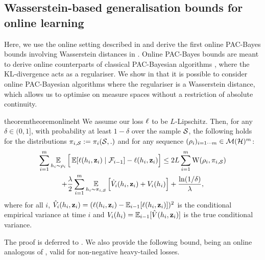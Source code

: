 \documentclass{article}
\begin{document}
\subsection{Wasserstein-based generalisation bounds for online learning}
\label{sec:wasserstein-online}
Here, we use the online setting described in  and derive the first online PAC-Bayes bounds involving Wasserstein distances in . 
Online PAC-Bayes bounds are meant to derive online counterparts of classical PAC-Bayesian algorithms \cite{haddouche2022online}, where the KL-divergence acts as a regulariser.
We show in   that it is possible to consider online PAC-Bayesian algorithms where the regulariser is a Wasserstein distance, which allows us to optimise on measure spaces without a restriction of absolute continuity.

\begin{restatable}{theorem}{theoremonlineht}\label{theorem:online-ht}
 We assume our loss $\loss$ to be $L$-Lipschitz.
Then, for any $\delta\in(0,1]$, with probability at least $1-\delta$ over the sample $\S$, the following holds for the distributions $\P_{i,\S}\defeq \P_i(\S,.)$ and for any sequence $(\Q_i)_{i=1\cdots m}\in\Mcal(\H)^m$:
\begin{multline*}
\sum_{i=1}^m \EE_{h_i\sim \Q_{i}} \Big[\EE[\loss(h_i,\z_i) \mid \Fcal_{i-1}] - \loss(h_i,\z_i) \Big]  \le 2L\sum_{i=1}^{m}\W(\Q_{i}, \P_{i,\S}) \\
+ \frac{\lambda}{2}\sum_{i=1}^m \EE_{h_i\sim \P_{i,\S}}\left[ \Vhat_i(h_i,\z_i) + V_i(h_i) \right]+\frac{\ln(1/\delta)}{\lambda}, 
\end{multline*}
where for all $i$, $\Vhat_i(h_i,\z_i)= (\loss(h_i,\z_i)-\EE_{i-1}[\loss(h_i,\z_i)])^2$ is the conditional empirical variance at time $i$ and $V_i(h_i)= \EE_{i-1}[\Vhat(h_i,\z_i)]$ is the true conditional variance.
\end{restatable}

The proof is deferred to .
We also provide the following bound, being an online analogous of , valid for non-negative heavy-tailed losses.
\end{document}
